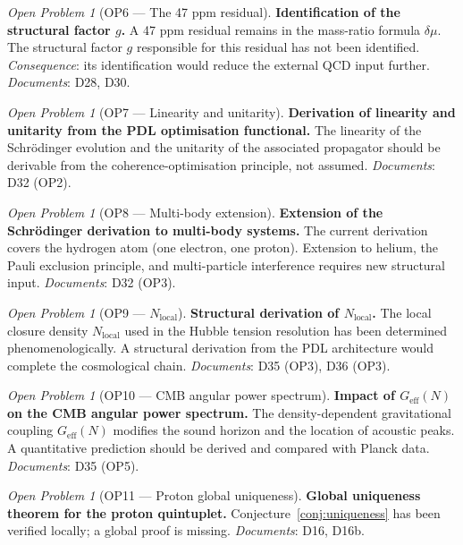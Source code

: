 \documentclass[11pt,a4paper]{article}
\theoremstyle{plain}
\theoremstyle{definition}
\theoremstyle{remark}
\newtheorem{openproblem}[theorem]{Open Problem}
\newcommand{\Geff}{G_{\mathrm{eff}}}
\begin{document}
\begin{openproblem}[OP6 — The 47 ppm residual]
\label{op:residual}
\textbf{Identification of the structural factor $g$.}
A 47 ppm residual remains in the mass-ratio formula $\delta\mu$.
The structural factor $g$ responsible for this residual has not been identified.
\emph{Consequence}: its identification would reduce the external QCD input further.
\emph{Documents}: D28, D30.
\end{openproblem}

\begin{openproblem}[OP7 — Linearity and unitarity]
\label{op:unitarity}
\textbf{Derivation of linearity and unitarity from the PDL optimisation functional.}
The linearity of the Schr\"odinger evolution and the unitarity of the associated propagator should be derivable from the coherence-optimisation principle, not assumed.
\emph{Documents}: D32 (OP2).
\end{openproblem}

\begin{openproblem}[OP8 — Multi-body extension]
\label{op:multi}
\textbf{Extension of the Schr\"odinger derivation to multi-body systems.}
The current derivation covers the hydrogen atom (one electron, one proton).
Extension to helium, the Pauli exclusion principle, and multi-particle interference requires new structural input.
\emph{Documents}: D32 (OP3).
\end{openproblem}

\begin{openproblem}[OP9 — $N_{\mathrm{local}}$]
\label{op:N_local}
\textbf{Structural derivation of $N_{\mathrm{local}}$.}
The local closure density $N_{\mathrm{local}}$ used in the Hubble tension resolution has been determined phenomenologically.
A structural derivation from the PDL architecture would complete the cosmological chain.
\emph{Documents}: D35 (OP3), D36 (OP3).
\end{openproblem}

\begin{openproblem}[OP10 — CMB angular power spectrum]
\label{op:CMB}
\textbf{Impact of $\Geff(N)$ on the CMB angular power spectrum.}
The density-dependent gravitational coupling $\Geff(N)$ modifies the sound horizon and the location of acoustic peaks.
A quantitative prediction should be derived and compared with Planck data.
\emph{Documents}: D35 (OP5).
\end{openproblem}

\begin{openproblem}[OP11 — Proton global uniqueness]
\label{op:uniqueness}
\textbf{Global uniqueness theorem for the proton quintuplet.}
Conjecture~\ref{conj:uniqueness} has been verified locally; a global proof is missing.
\emph{Documents}: D16, D16b.
\end{openproblem}
\end{document}
